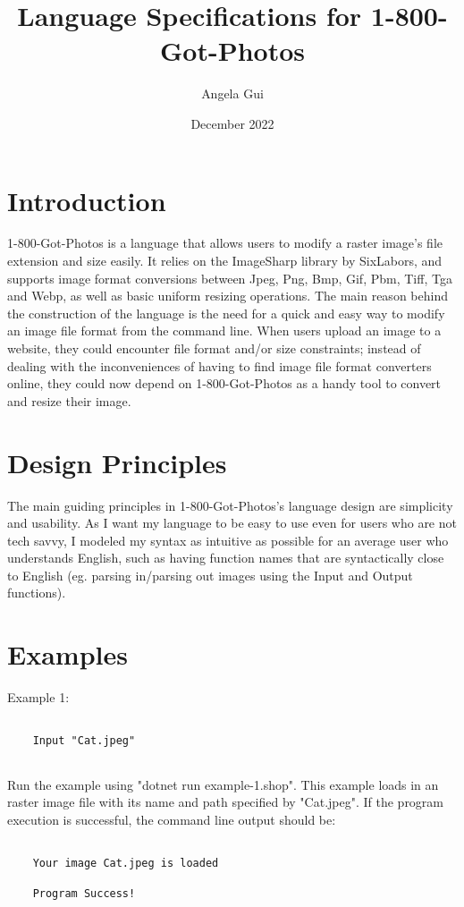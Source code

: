 \documentclass{article}
\title{Language Specifications for 1-800-Got-Photos}
\author{Angela Gui}
\date{December 2022}
\begin{document}
\maketitle

\section{Introduction}

1-800-Got-Photos is a language that allows users to modify a raster image's file extension and size easily. It relies on the ImageSharp library by SixLabors, and supports image format conversions between Jpeg, Png, Bmp, Gif, Pbm, Tiff, Tga and Webp, as well as basic uniform resizing operations. The main reason behind the construction of the language is the need for a quick and easy way to modify an image file format from the command line. When users upload an image to a website, they could encounter file format and/or size constraints; instead of dealing with the inconveniences of having to find image file format converters online, they could now depend on 1-800-Got-Photos as a handy tool to convert and resize their image.

\section{Design Principles}

The main guiding principles in 1-800-Got-Photos's language design are simplicity and usability. As I want my language to be easy to use even for users who are not tech savvy, I modeled my syntax as intuitive as possible for an average user who understands English, such as having function names that are syntactically close to English (eg. parsing in/parsing out images using the Input and Output functions).

\section{Examples}

    Example 1: \begin{verbatim}

    Input "Cat.jpeg"
        
    \end{verbatim}

Run the example using "dotnet run example-1.shop". This example loads in an raster image file with its name and path specified by "Cat.jpeg". If the program execution is successful, the command line output should be: 
    \begin{verbatim}

    Your image Cat.jpeg is loaded 

    Program Success!

        
    \end{verbatim}
    
\end{document}
